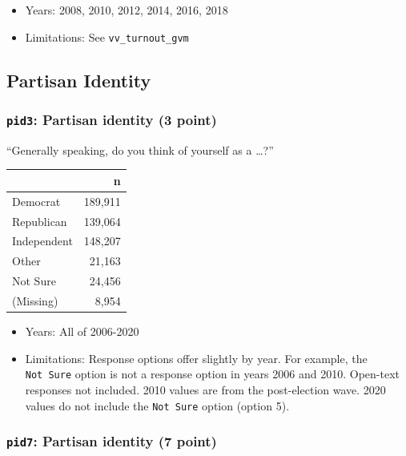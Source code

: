 \documentclass[10pt,article,oneside]{memoir}
\theoremstyle{definition}
\begin{document}
\begin{itemize}
\tightlist
\item
  Years: 2008, 2010, 2012, 2014, 2016, 2018
\item
  Limitations: See \texttt{vv\_turnout\_gvm}
\end{itemize}

\newpage

\hypertarget{partisan-identity}{%
\subsection{Partisan Identity}\label{partisan-identity}}

\hypertarget{pid3-partisan-identity-3-point}{%
\subsubsection{\texorpdfstring{\texttt{pid3}: Partisan identity (3
point)}{pid3: Partisan identity (3 point)}}\label{pid3-partisan-identity-3-point}}

``Generally speaking, do you think of yourself as a \ldots?''

\begin{table}[H]
\centering
\begin{tabular}{lr}
\toprule
 & n\\
\midrule
Democrat & 189,911\\
Republican & 139,064\\
Independent & 148,207\\
Other & 21,163\\
Not Sure & 24,456\\
(Missing) & 8,954\\
\bottomrule
\end{tabular}
\end{table}

\begin{itemize}
\tightlist
\item
  Years: All of 2006-2020
\item
  Limitations: Response options offer slightly by year. For example, the
  \texttt{Not\ Sure} option is not a response option in years 2006 and
  2010. Open-text responses not included. 2010 values are from the
  post-election wave. 2020 values do not include the \texttt{Not\ Sure}
  option (option 5).
\end{itemize}

\hypertarget{pid7-partisan-identity-7-point}{%
\subsubsection{\texorpdfstring{\texttt{pid7}: Partisan identity (7
point)}{pid7: Partisan identity (7 point)}}\label{pid7-partisan-identity-7-point}}
\end{document}

